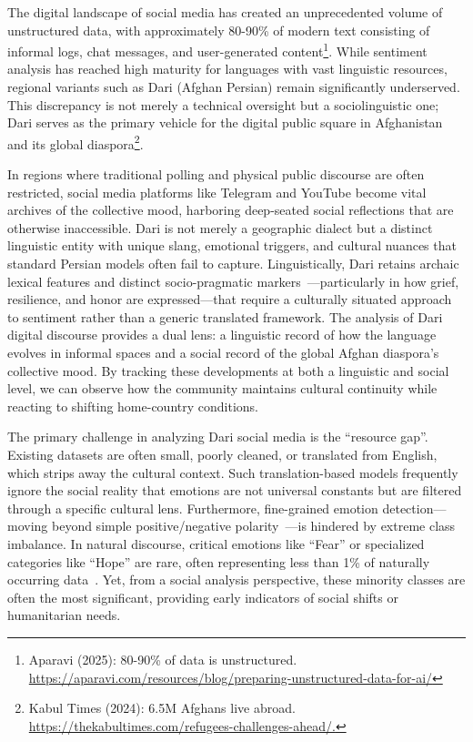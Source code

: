 \documentclass[runningheads]{llncs}
\begin{document}
The digital landscape of social media has created an unprecedented volume of 
unstructured data, with approximately 80-90\% of modern text consisting of 
informal logs, chat messages, and user-generated content\footnote{Aparavi (2025): 80-90\% of data is unstructured. \url{https://aparavi.com/resources/blog/preparing-unstructured-data-for-ai/}}.
While sentiment analysis has reached high maturity for languages with vast 
linguistic resources, regional variants such as Dari (Afghan Persian) remain 
significantly underserved. This discrepancy is not merely a technical 
oversight but a sociolinguistic one; Dari serves as the primary vehicle for 
the digital public square in Afghanistan and its global diaspora\footnote{Kabul Times (2024): 6.5M Afghans live abroad. \url{https://thekabultimes.com/refugees-challenges-ahead/.}}.

In regions where traditional polling and physical public discourse are often 
restricted, social media platforms like Telegram and YouTube become vital 
archives of the collective mood, harboring deep-seated social reflections 
that are otherwise inaccessible. Dari is not merely a geographic dialect but 
a distinct linguistic entity with unique slang, emotional triggers, and 
cultural nuances that standard Persian models often fail to capture. 
Linguistically, Dari retains archaic lexical features and distinct 
socio-pragmatic markers~\cite{baker2016dari}—particularly in how grief, resilience, and honor are 
expressed—that require a culturally situated approach to sentiment rather 
than a generic translated framework. The analysis of Dari digital discourse 
provides a dual lens: a linguistic record of how the language evolves in 
informal spaces and a social record of the global Afghan diaspora's 
collective mood. By tracking these developments at both a linguistic and 
social level, we can observe how the community maintains cultural continuity 
while reacting to shifting home-country conditions.

The primary challenge in analyzing Dari social media is the ``resource gap''. Existing datasets are often small, poorly 
cleaned, or translated from English, which strips away the cultural context. 
Such translation-based models frequently ignore the social reality that 
emotions are not universal constants but are filtered through a specific 
cultural lens. Furthermore, fine-grained emotion detection—moving beyond 
simple positive/negative polarity~\cite{mudiyanselage2026context}—is 
hindered by extreme class imbalance. In natural discourse, critical emotions 
like ``Fear'' or specialized categories like ``Hope'' are rare, often 
representing less than 1\% of naturally occurring data~\cite{kumar2025longtail}. Yet, from a social 
analysis perspective, these minority classes are often the most significant, 
providing early indicators of social shifts or humanitarian needs.
\end{document}

